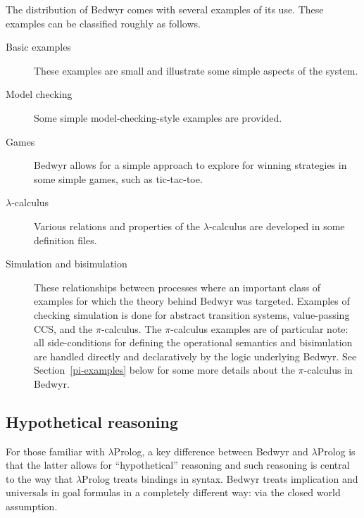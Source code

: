 \documentclass{article}
\newcommand{\lp}{$\lambda$Prolog}
\begin{document}
The distribution of Bedwyr comes with several examples of its use.
These examples can be classified roughly as follows.

\begin{description}
\item[Basic examples] These examples are small and illustrate some
  simple aspects of the system.

\item[Model checking] Some simple model-checking-style examples are
  provided.

\item[Games] Bedwyr allows for a simple approach to explore for
  winning strategies in some simple games, such as tic-tac-toe.

\item[$\lambda$-calculus] Various relations and properties of the
  $\lambda$-calculus are developed in some definition files.

\item[Simulation and bisimulation] These relationships between
  processes where an important class of examples for which the theory
  behind Bedwyr was targeted.  Examples of checking simulation is done
  for abstract transition systems, value-passing CCS, and the
  $\pi$-calculus.  The $\pi$-calculus examples are of particular note:
  all side-conditions for defining the operational semantics and
  bisimulation are handled directly and declaratively by the logic
  underlying Bedwyr.  See Section~\ref{pi-examples} below for some more
  details about the $\pi$-calculus in Bedwyr.

\end{description}

\subsection{Hypothetical reasoning}

For those familiar with \lp{}, a key difference between
Bedwyr and \lp{} is that the latter allows for ``hypothetical''
reasoning and such reasoning is central to the way that \lp{} treats
bindings in syntax.    Bedwyr treats implication and universals in
goal formulas in a completely different way: via the closed world
assumption.
\end{document}

